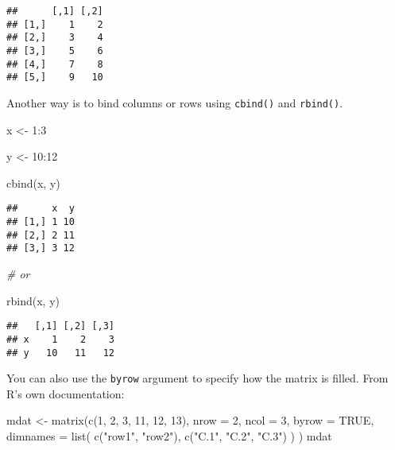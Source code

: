 \documentclass[
]{book}
\newenvironment{Shaded}{\begin{snugshade}}{\end{snugshade}}
\newcommand{\AttributeTok}[1]{\textcolor[rgb]{0.77,0.63,0.00}{#1}}
\newcommand{\CommentTok}[1]{\textcolor[rgb]{0.56,0.35,0.01}{\textit{#1}}}
\newcommand{\ConstantTok}[1]{\textcolor[rgb]{0.00,0.00,0.00}{#1}}
\newcommand{\DecValTok}[1]{\textcolor[rgb]{0.00,0.00,0.81}{#1}}
\newcommand{\FunctionTok}[1]{\textcolor[rgb]{0.00,0.00,0.00}{#1}}
\newcommand{\NormalTok}[1]{#1}
\newcommand{\OtherTok}[1]{\textcolor[rgb]{0.56,0.35,0.01}{#1}}
\newcommand{\SpecialCharTok}[1]{\textcolor[rgb]{0.00,0.00,0.00}{#1}}
\newcommand{\StringTok}[1]{\textcolor[rgb]{0.31,0.60,0.02}{#1}}
\begin{document}
\begin{verbatim}
##      [,1] [,2]
## [1,]    1    2
## [2,]    3    4
## [3,]    5    6
## [4,]    7    8
## [5,]    9   10
\end{verbatim}

Another way is to bind columns or rows using \texttt{cbind()} and \texttt{rbind()}.

\begin{Shaded}
\begin{Highlighting}[]
\NormalTok{x }\OtherTok{\textless{}{-}} \DecValTok{1}\SpecialCharTok{:}\DecValTok{3}

\NormalTok{y }\OtherTok{\textless{}{-}} \DecValTok{10}\SpecialCharTok{:}\DecValTok{12}

\FunctionTok{cbind}\NormalTok{(x, y)}
\end{Highlighting}
\end{Shaded}

\begin{verbatim}
##      x  y
## [1,] 1 10
## [2,] 2 11
## [3,] 3 12
\end{verbatim}

\begin{Shaded}
\begin{Highlighting}[]
\CommentTok{\# or}

\FunctionTok{rbind}\NormalTok{(x, y)}
\end{Highlighting}
\end{Shaded}

\begin{verbatim}
##   [,1] [,2] [,3]
## x    1    2    3
## y   10   11   12
\end{verbatim}

You can also use the \texttt{byrow} argument to specify how the matrix is filled. From R's own documentation:

\begin{Shaded}
\begin{Highlighting}[]
\NormalTok{mdat }\OtherTok{\textless{}{-}} \FunctionTok{matrix}\NormalTok{(}\FunctionTok{c}\NormalTok{(}\DecValTok{1}\NormalTok{, }\DecValTok{2}\NormalTok{, }\DecValTok{3}\NormalTok{, }\DecValTok{11}\NormalTok{, }\DecValTok{12}\NormalTok{, }\DecValTok{13}\NormalTok{),}
  \AttributeTok{nrow =} \DecValTok{2}\NormalTok{,}
  \AttributeTok{ncol =} \DecValTok{3}\NormalTok{,}
  \AttributeTok{byrow =} \ConstantTok{TRUE}\NormalTok{,}
  \AttributeTok{dimnames =} \FunctionTok{list}\NormalTok{(}
    \FunctionTok{c}\NormalTok{(}\StringTok{"row1"}\NormalTok{, }\StringTok{"row2"}\NormalTok{),}
    \FunctionTok{c}\NormalTok{(}\StringTok{"C.1"}\NormalTok{, }\StringTok{"C.2"}\NormalTok{, }\StringTok{"C.3"}\NormalTok{)}
\NormalTok{  )}
\NormalTok{)}
\NormalTok{mdat}
\end{Highlighting}
\end{Shaded}
\end{document}
